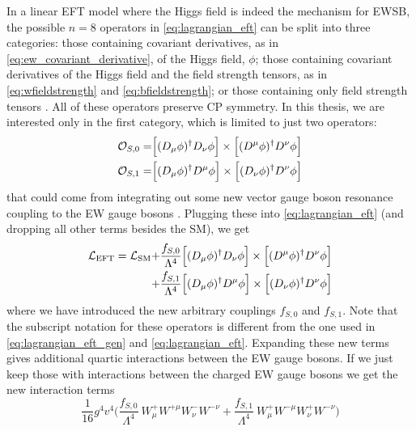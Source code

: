 
In a linear EFT model where the Higgs field is indeed the mechanism for EWSB, 
the possible $n=8$ operators 
in \eqn\eqref{eq:lagrangian_eft} can
be split into three categories: those containing covariant derivatives,
as in \eqn\eqref{eq:ew_covariant_derivative}, of the Higgs field, $\phi$; 
those containing covariant derivatives of the Higgs field and 
the field strength tensors, as 
in \eqn\eqref{eq:wfieldstrength} and \eqref{eq:bfieldstrength};
or those containing only field strength tensors \cite{Eboli:2006wa,Eboli:2003nq}. 
All of these operators preserve CP symmetry.
In this thesis, we are
interested only in the first category, which is limited to just two operators:
\begin{align}
\mathcal{O}_{S,0} =& \Big[(D_{\mu}\phi)^{\dagger} D_{\nu} \phi\Big] \times \Big[(D^{\mu} \phi)^{\dagger} D^{\nu} \phi \Big] \\
\mathcal{O}_{S,1} =& \Big[(D_{\mu}\phi)^{\dagger} D^{\mu} \phi\Big] \times \Big[(D_{\nu} \phi)^{\dagger} D^{\nu} \phi \Big]
\end{align}
that could come from integrating out some new 
vector gauge boson resonance coupling to the EW gauge bosons \cite{Baak:2013fwa}.
Plugging these into \eqn\eqref{eq:lagrangian_eft} (and dropping all other terms
besides the SM), we get
\begin{equation}
\begin{aligned}
\mathcal{L}_{\textrm{EFT}} = \mathcal{L}_{\textrm{SM}} +&
\frac{f_{S,0}}{\Lambda^4}\Big[(D_{\mu}\phi)^{\dagger} D_{\nu} \phi\Big] \times \Big[(D^{\mu} \phi)^{\dagger} D^{\nu} \phi \Big] \\
+& \frac{f_{S,1}}{\Lambda^4}\Big[(D_{\mu}\phi)^{\dagger} D^{\mu} \phi\Big] \times \Big[(D_{\nu} \phi)^{\dagger} D^{\nu} \phi \Big]
\end{aligned}
\label{eq:lagrangian_aqgc}
\end{equation}
where we have introduced the new arbitrary couplings $f_{S,0}$ and $f_{S,1}$.
Note that the subscript notation for these operators is different 
from the one used in \eqn\eqref{eq:lagrangian_eft_gen} and \eqn\eqref{eq:lagrangian_eft}.
Expanding these new terms gives additional quartic interactions between 
the EW gauge bosons. If we just keep those with interactions between
the charged EW gauge bosons we get the new interaction terms
\begin{equation}
\frac{1}{16} g^4 v^4 \Big(  \frac{f_{S,0}}{\Lambda^4}~W_{\mu}^+ W^{+\mu} W_{\nu}^- W^{-\nu} + \frac{f_{S,1}}{\Lambda^4}~W_{\mu}^+ W^{-\mu} W_{\nu}^+W^{-\nu} \Big) 
\end{equation}
